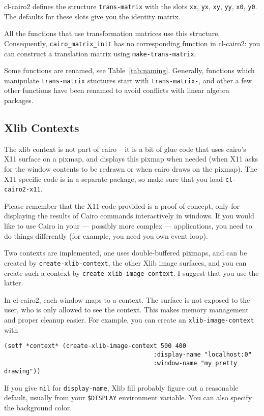 \documentclass[12pt,letterpaper]{article}
\begin{document}
cl-cairo2 defines the structure \lstinline!trans-matrix! with the
slots \lstinline!xx!, \lstinline!yx!, \lstinline!xy!, \lstinline!yy!,
\lstinline!x0!, \lstinline!y0!.  The defaults for these slots give you
the identity matrix.

All the functions that use transformation matrices use this structure.
Consequently, \verb!cairo_matrix_init! has no corresponding function
in cl-cairo2: you can construct a translation matrix using
\lstinline!make-trans-matrix!.

Some functions are renamed, see Table~\ref{tab:naming}.  Generally,
functions which manipulate \lstinline!trans-matrix! stuctures start
with \lstinline!trans-matrix-!, and other a few other functions have
been renamed to avoid conflicts with linear algebra packages.

\subsection{Xlib Contexts}
\label{sec:xlib-context}

The xlib context is not part of cairo -- it is a bit of glue code that
uses cairo's X11 surface on a pixmap, and displays this pixmap when
needed (when X11 asks for the window contents to be redrawn or when
cairo draws on the pixmap).  The X11 specific code is in a separate
package, so make sure that you load \lstinline!cl-cairo2-x11!.

Please remember that the X11 code provided is a proof of concept, only
for displaying the results of Cairo commands interactively in windows.
If you would like to use Cairo in your --- possibly more complex ---
applications, you need to do things differently (for example, you need
you own event loop).

Two contexts are implemented, one uses double-buffered pixmaps, and
can be created by \lstinline!create-xlib-context!, the other Xlib
image surfaces, and you can create such a context by
\lstinline!create-xlib-image-context!.  I suggest that you use the
latter.

In cl-cairo2, each window maps to a context.  The surface is not
exposed to the user, who is only allowed to see the context.  This
makes memory management and proper cleanup easier.  For example, you
can create an \lstinline!xlib-image-context! with
\begin{lstlisting}
(setf *context* (create-xlib-image-context 500 400
                                         :display-name "localhost:0"
                                         :window-name "my pretty drawing"))
\end{lstlisting}
If you give \lstinline!nil! for \lstinline!display-name!, Xlib fill
probably figure out a reasonable default, usually from your
\verb!$DISPLAY! environment variable.  You can also specify the
background color.
\end{document}
